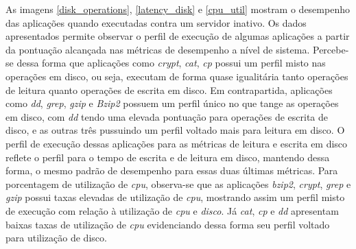 As imagens \ref{disk_operations}, \ref{latency_disk} e \ref{cpu_util} mostram o desempenho das aplicações quando executadas contra um servidor inativo. Os dados apresentados permite observar o perfil de execução de algumas aplicações a partir da pontuação alcançada nas métricas de desempenho a nível de sistema. Percebe-se dessa forma que aplicações como \textit{crypt}, \textit{cat}, \textit{cp} possui um perfil misto nas operações em disco, ou seja, executam de forma quase igualitária tanto operações de leitura quanto operações de escrita em disco. Em contrapartida, aplicações como \textit{dd}, \textit{grep}, \textit{gzip} e \textit{Bzip2} possuem um perfil único no que tange as operações em disco, com \textit{dd} tendo uma elevada pontuação para operações de escrita de disco, e as outras três pussuindo um perfil voltado mais para leitura em disco. O perfil de execução dessas aplicações para as métricas de leitura e escrita em disco reflete o perfil para o tempo de escrita e de leitura em disco, mantendo dessa forma, o mesmo padrão de desempenho para essas duas últimas métricas. Para porcentagem de utilização de \textit{cpu}, observa-se que as aplicações \textit{bzip2}, \textit{crypt}, \textit{grep} e \textit{gzip} possui taxas elevadas de utilização de \textit{cpu}, mostrando assim um  perfil misto de execução com relação à utilização de \textit{cpu} e \textit{disco}. Já \textit{cat}, \textit{cp} e \textit{dd} apresentam baixas taxas de utilização de \textit{cpu} evidenciando dessa forma seu perfil voltado para utilização de disco.

